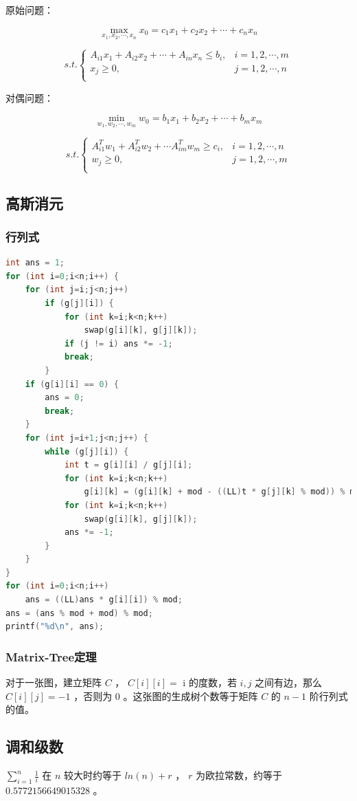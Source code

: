 \documentclass{article}
\begin{document}
原始问题：

$$
\max_{x_1, x_2, \cdots, x_n} x_0 = c_1x_1 + c_2x_2 + \cdots + c_nx_n
$$

$$
s.t.
\left\{
\begin{array}{ll}
A_{i1}x_1 + A_{i2}x_2 + \cdots + A_{in}x_n \leq b_i, & i = 1, 2, \cdots, m \\
x_j \geq 0, & j = 1, 2, \cdots, n \\
\end{array}
\right.
$$

对偶问题：

$$
\min_{w_1, w_2, \cdots, w_m} w_0 = b_1x_1 + b_2x_2 + \cdots + b_mx_m
$$

$$
s.t.
\left\{
\begin{array}{ll}
A^T_{i1}w_1 + A^T_{i2}w_2 + \cdots A^T_{im}w_m \geq c_i, & i = 1, 2, \cdots, n \\
w_j \geq 0, & j = 1, 2, \cdots, m \\
\end{array}
\right.
$$

\subsection{高斯消元}
\subsubsection{行列式}
\begin{lstlisting}[language=C++]
int ans = 1;
for (int i=0;i<n;i++) {
	for (int j=i;j<n;j++)
		if (g[j][i]) {
			for (int k=i;k<n;k++)
				swap(g[i][k], g[j][k]);
			if (j != i) ans *= -1;
			break;
		}
	if (g[i][i] == 0) {
		ans = 0;
		break;
	}
	for (int j=i+1;j<n;j++) {
		while (g[j][i]) {
			int t = g[i][i] / g[j][i];
			for (int k=i;k<n;k++)
				g[i][k] = (g[i][k] + mod - ((LL)t * g[j][k] % mod)) % mod;
			for (int k=i;k<n;k++)
				swap(g[i][k], g[j][k]);
			ans *= -1;
		}
	}
}
for (int i=0;i<n;i++)
	ans = ((LL)ans * g[i][i]) % mod;
ans = (ans % mod + mod) % mod;
printf("%d\n", ans);
\end{lstlisting}
\subsubsection{Matrix-Tree定理}
对于一张图，建立矩阵 $C$ ， $C[i][i] = $ i 的度数，若 $i, j$ 之间有边，那么 $C[i][j] = -1$ ，否则为 $0$ 。这张图的生成树个数等于矩阵 $C$ 的 $n-1$ 阶行列式的值。
\subsection{调和级数}
$\sum\limits_{i=1}^n \frac{1}{i}$ 在 $n$ 较大时约等于 $ln(n) + r$ ， $r$ 为欧拉常数，约等于 $0.5772156649015328$ 。
\end{document}
